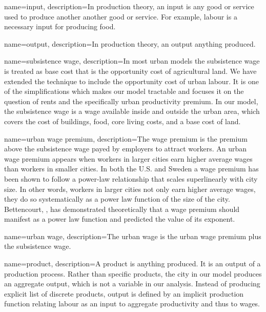 {
name=input,
description={In production theory, an input is any good or service used to produce another another good or service. %
For example, labour is a necessary input for producing food. }
}

{
name=output,
description={In production theory, an output anything produced.} %
}

{
name=subsistence wage,
description={In most urban models the subsistence wage is treated as base cost that is the opportunity cost of agricultural land. We have extended the technique to include the opportunity cost of urban labour. It is one of the simplifications which makes our model tractable and focuses it on the question of rents and the specifically urban productivity premium. In our model, the subsistence wage is a wage available inside and outside the urban area, which covers the cost of buildings, food, core living costs, and a base cost of land.}
}

{
name=urban wage premium,
description={The wage premium is the premium above the \gls{subsistence wage} payed by employers to attract workers. An urban wage premium appears when workers in larger cities earn higher average wages than workers in smaller cities. In both the U.S. and Sweden a wage premium has been shown to follow a power-law relationship that scales superlinearly with city size. In other words, workers in larger cities not only earn higher average wages, they do so systematically as a power law function of the size of the city. Bettencourt, \cite{bettencourtIntroductionUrbanScience2021}, has demonstrated theoretically that a wage premium should manifest as a power law function and predicted the value of its exponent.}
}

{
name=urban wage,
description={The \gls{urban wage} is the \gls{urban wage premium} plus the \gls{subsistence wage}.}
}

{
name=product,
description={A product is anything produced. It is an \gls{output} of a production process. %
Rather than specific products, the city in our model produces an aggregate output, which is not a variable in our analysis. Instead of producing explicit list of discrete products, output is defined by an implicit production function relating labour as an input to aggregate productivity and thus to wages. %
}
}

